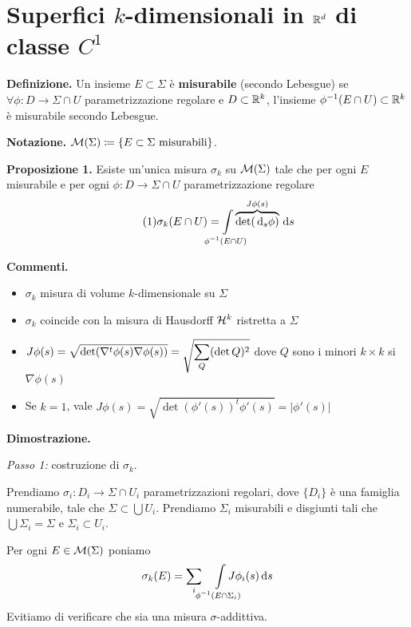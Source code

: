 \section{Superfici $k$-dimensionali in $\mathbb R^d$ di classe $C^1$}

\textbf{Definizione.} Un insieme $E \subset \Sigma$ è \textbf{misurabile} (secondo Lebesgue) se $\forall \phi \colon D \to \Sigma \cap U$ parametrizzazione regolare e $D \subset \mathbb R^k$, l'insieme $\phi^{-1}(E \cap U) \subset \mathbb R^k$ è misurabile secondo Lebesgue.

\textbf{Notazione.} $\mathcal{M}(\Sigma) \coloneqq  \{ E \subset \Sigma \text{ misurabili} \}$.

\textbf{Proposizione 1.} Esiste un'unica misura $\sigma_k$ su $\mathcal{M}(\Sigma)$ tale che per ogni $E$ misurabile e per ogni $\phi \colon D \to \Sigma \cap U$ parametrizzazione regolare
%
\begin{equation}
	\label{eq:16dic_formula1} \tag{1}
	\sigma_k (E \cap U) = \int\limits_{\mathclap{\phi^{-1}(E \cap U)}} \overbrace{\det (\dd_s \phi)}^{J\phi (s)} \dd s
\end{equation}

\textbf{Commenti.} 
\begin{itemize}

	\item $\sigma_k$ misura di volume $k$-dimensionale su $\Sigma$

	\item $\sigma_k$ coincide con la misura di Hausdorff $\mathcal{H}^k$ ristretta a $\Sigma$

	\item $\displaystyle J\phi (s) = \sqrt{\det (\nabla^t \phi(s) \nabla \phi(s))} = \sqrt{\sum_Q (\det Q)^2} $ dove $Q$ sono i minori $k \times k$ si $\nabla \phi(s)$

	\item Se $k = 1$, vale $J\phi(s) = \sqrt{\det(\phi'(s))^t \phi'(s)} = |\phi'(s)| $

\end{itemize}


\textbf{Dimostrazione.} 

\textit{Passo 1:} costruzione di $\sigma_k$.

Prendiamo $\sigma_i \colon  D_i \to \Sigma \cap U_i$ parametrizzazioni regolari, dove $\{D_i\}$ è una famiglia numerabile, tale che $\Sigma \subset \bigcup U_i$.
Prendiamo $\Sigma_i$ misurabili e disgiunti tali che $\bigcup \Sigma_i = \Sigma$ e $\Sigma_i \subset U_i$.

Per ogni $E \in \mathcal{M}(\Sigma)$ poniamo 
%
$$
	\sigma_k (E) = \sum_i \quad  \int\limits_{\mathclap{\phi^{-1}(E \cap \Sigma_i)}} J \phi_i(s) \dd s
$$
%
Evitiamo di verificare che sia una misura $\sigma$-addittiva.

